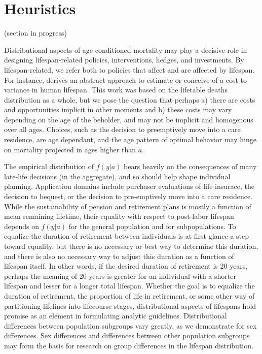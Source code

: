 \documentclass{article}
\begin{document}
\section*{Heuristics}
(section in progress)

Distributional aspects of age-conditioned mortality may play a decisive role
in designing lifespan-related policies, interventions, hedges, and investments.
By lifespan-related, we refer both to policies that affect and are affected by
lifespan. For instance, \citet{edwards2013cost} derives an abstract approach to
estimate or conceive of a cost to variance in human lifespan. This work was
based on the lifetable deaths distribution as a whole, but we pose the question
that perhaps a) there are costs and opportunities implicit in other moments and
b) these costs may vary depending on the age of the beholder, and may not be implicit and
homogenous over all ages. Choices, such as the decision to
preemptively move into a care residence, are age dependant, and the age pattern
of optimal behavior may hinge on mortality projected in ages higher than $a$.

The empirical distribution
of $f(y|a)$ bears heavily on the consequences of many late-life
decisions (in the aggregate), and so should help shape individual planning.
Application domains include purchaser evaluations of life insurace, the decision to bequest, or the decision to pre-emptively move into a care
residence. While the sustainability of pension and retirement plans is
mostly a function of mean remaining lifetime, their equality with respect to
post-labor lifespan depends on $f(y|a)$ for the general population and for
subpopulations. To equalize the duration of retirement between
individuals is at first glance a step toward equality, but there is no necessary or best
way to determine this duration, and there is also no necessary way to adjust
this duration as a function of lifespan itself. In other words, if the desired
duration of retirement is 20 years, perhaps the meaning of 20 years is greater for an individual with a shorter lifespan and lesser for a longer total lifespan. Whether the goal is to equalize the duration of retirement, the proportion of life in retirement, or some other way of partitioning lifelines into lifecourse stages, distributional aspects of lifespans hold promise as an element in formulating analytic guidelines. Distributional differences between population subgroups vary greatly, as we demonstrate for sex differences. Sex differences and differences between other population subgroups may form the basis for research on group differences in
the lifespan distribution. 



\end{document}
